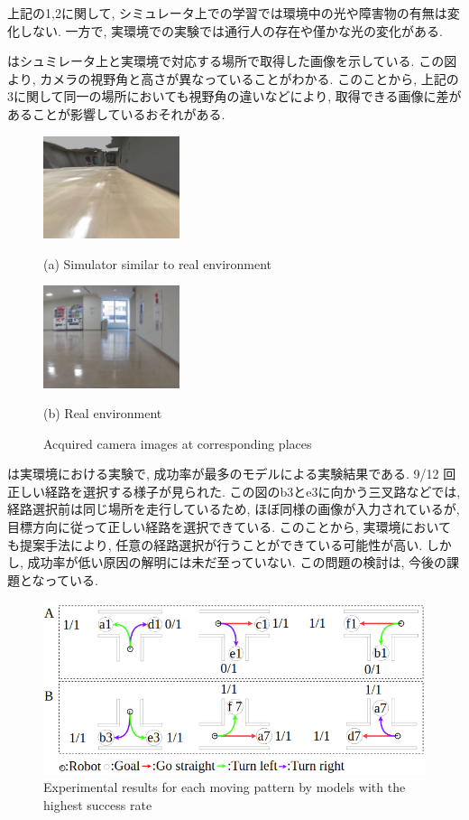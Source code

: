上記の1,2に関して, シミュレータ上での学習では環境中の光や障害物の有無は変化しない. 一方で, 実環境での実験では通行人の存在や僅かな光の変化がある. 
\par
{}はシュミレータ上と実環境で対応する場所で取得した画像を示している. この図より, カメラの視野角と高さが異なっていることがわかる. このことから, 上記の3に関して同一の場所においても視野角の違いなどにより, 取得できる画像に差があることが影響しているおそれがある.

\begin{figure}[h]
  \centering
  \begin{minipage}[b]{67mm}
    \centering
    \includegraphics[width=40mm]{images/horizonal_sim.png}
    \caption*{(a) Simulator similar to real environment}
  \end{minipage} 
  \begin{minipage}[b]{67mm}
    \centering
    \includegraphics[width=40mm]{images/horizonal_real.png}
    \caption*{(b) Real environment}
  \end{minipage}
  \caption{Acquired camera images at corresponding places}
  \label{Fig:horizonal}
\end{figure}

は実環境における実験で, 成功率が最多のモデルによる実験結果である. 9/12 回正しい経路を選択する様子が見られた. この図のb3とe3に向かう三叉路などでは, 経路選択前は同じ場所を走行しているため, ほぼ同様の画像が入力されているが, 目標方向に従って正しい経路を選択できている. このことから, 実環境においても提案手法により, 任意の経路選択が行うことができている可能性が高い.
しかし, 成功率が低い原因の解明には未だ至っていない. この問題の検討は, 今後の課題となっている.

\begin{figure}[hbtp]
  \centering
 \includegraphics[keepaspectratio, scale=0.40]
      {images/real_model3.png}
 \caption{Experimental results for each moving pattern by models with the highest success rate}
 \label{Fig:real_model3}
\end{figure}

\newpage
